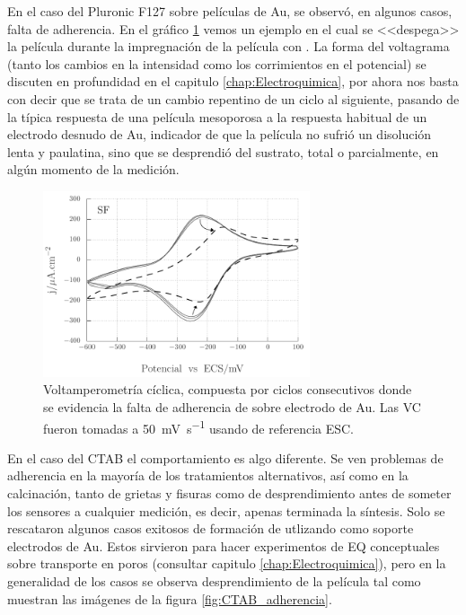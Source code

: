 			En el caso del Pluronic F127 sobre películas de Au, se observó, en algunos casos, falta de adherencia. En el gráfico \ref{fig:adherencia_F127} vemos un ejemplo en el cual se <<despega>> la película durante la impregnación de la película con \aminorutenio. La forma del voltagrama (tanto los cambios en la intensidad como los corrimientos en el potencial) se discuten en profundidad en el capitulo \ref{chap:Electroquimica}, por ahora nos basta con decir que se trata de un cambio repentino de un ciclo al siguiente, pasando de la típica respuesta de una película mesoporosa a la respuesta habitual de un electrodo desnudo de Au, indicador de que la película no sufrió un disolución lenta y paulatina, sino que se desprendió del sustrato, total o parcialmente, en algún momento de la medición.
				\begin{figure}[th]
				 	   	    \begin{center} 
				        	\includegraphics[width=0.70\textwidth]{Graficos/Adherencia_F127.pdf}
				       		\caption[Adherencia de \pdmF \space sobre una película delgada de Au.]{Voltamperometría cíclica, compuesta por ciclos consecutivos donde se evidencia la falta de adherencia de \pdmF \space sobre electrodo de Au. Las VC fueron tomadas a \SI{50}{\milli\volt.\second^{-1}} usando de referencia ESC.}
				         	\label{fig:adherencia_F127}
				     		\end{center}
				     		\end{figure}

			En el caso del CTAB el comportamiento es algo diferente. Se ven problemas de adherencia en la mayoría de los tratamientos alternativos, así como en la calcinación, tanto de grietas y fisuras como de desprendimiento antes de someter los sensores a cualquier medición, es decir, apenas terminada la síntesis. Solo se rescataron algunos casos exitosos de formación de \pdmC\space utlizando como soporte electrodos de Au. Estos sirvieron para hacer experimentos de EQ conceptuales sobre transporte en poros (consultar capitulo \ref{chap:Electroquimica}), pero en la generalidad de los casos se observa desprendimiento de la película tal como muestran las imágenes de la figura \ref{fig:CTAB_adherencia}.
	     
